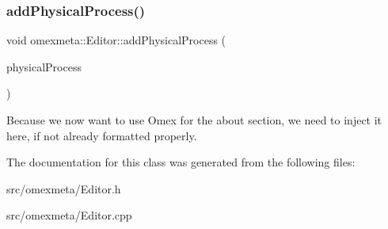 \subsubsection{\texorpdfstring{add\+Physical\+Process()}{addPhysicalProcess()}}
{\footnotesize\ttfamily void omexmeta\+::\+Editor\+::add\+Physical\+Process (\begin{DoxyParamCaption}\item[{\hyperlink{classomexmeta_1_1PhysicalProcess}{Physical\+Process} \&}]{physical\+Process }\end{DoxyParamCaption})}

Because we now want to use  Omex for the about section, we need to inject it here, if not already formatted properly.

The documentation for this class was generated from the following files\+:\begin{DoxyCompactItemize}
\item 
src/omexmeta/Editor.\+h\item 
src/omexmeta/Editor.\+cpp\end{DoxyCompactItemize}
